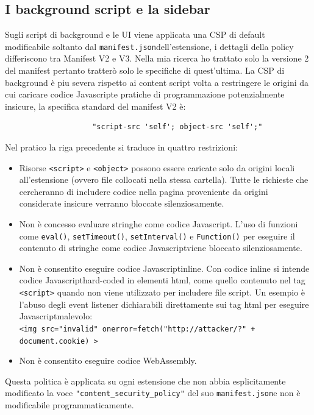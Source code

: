 \documentclass{sapthesis}
\newcommand{\code}[1]{\texttt{#1}}
\newcommand{\JS}{Javascript}
\newcommand{\manifest}{\code{manifest.json}}
\begin{document}
            \subsection{I background script e la sidebar}
            \label{sec:difese-background-sidebar}
                Sugli script di background e le UI viene applicata una CSP di default modificabile soltanto dal
                \manifest dell'estensione, i dettagli della policy differiscono tra Manifest V2 e V3. Nella
                mia ricerca ho trattato solo la versione 2 del manifest pertanto tratterò solo le specifiche
                di quest'ultima.
                La CSP di background è piu severa rispetto ai content script volta a restringere le origini
                da cui caricare codice \JS e pratiche di programmazione potenzialmente insicure, la specifica
                standard del manifest V2 è:
                \begin{lstlisting}
                    "script-src 'self'; object-src 'self';"
                \end{lstlisting}
                Nel pratico la riga precedente si traduce in quattro restrizioni:
                \begin{itemize}
                    \item Risorse \code{<script>} e \code{<object>} possono essere caricate solo da origini
                            locali all'estensione (ovvero file collocati nella stessa cartella). Tutte le
                            richieste che cercheranno di includere codice nella pagina proveniente da origini
                            considerate insicure verranno bloccate silenziosamente.
    
                    \item Non è concesso evaluare stringhe come codice \JS. L'uso di funzioni come
                            \code{eval()}, \code{setTimeout()}, \code{setInterval()} e \code{Function()}
                            per eseguire il contenuto di stringhe come codice \JS viene bloccato silenziosamente.
                    
                    \item Non è consentito eseguire codice \JS inline. Con codice inline si intende codice
                            \JS hard-coded in elementi html, come quello contenuto nel tag \code{<script>}
                            quando non viene utilizzato per includere file script. Un esempio è l'abuso degli
                            event listener dichiarabili direttamente sui tag html per eseguire \JS malevolo:\\
                            \code{<img src="invalid" onerror=fetch("http://attacker/?" + document.cookie) >}        
    
                    \item {} Non è consentito eseguire codice WebAssembly.
                
                \end{itemize}
                Questa politica è applicata su ogni estensione che non abbia esplicitamente modificato la voce
                \code{"content\_security\_policy"} del suo \manifest e non è modificabile programmaticamente.
                
\end{document}
